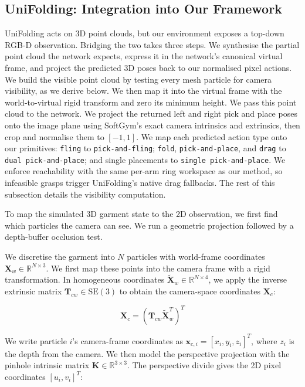 \documentclass[journal]{IEEEtran}
\begin{document}
\subsection{UniFolding: Integration into Our Framework}
UniFolding acts on 3D point clouds, but our environment exposes a top-down RGB-D observation. Bridging the two takes three steps. We synthesise the partial point cloud the network expects, express it in the network's canonical virtual frame, and project the predicted 3D poses back to our normalised pixel actions. We build the visible point cloud by testing every mesh particle for camera visibility, as we derive below. We then map it into the virtual frame with the world-to-virtual rigid transform and zero its minimum height. We pass this point cloud to the network. We project the returned left and right pick and place poses onto the image plane using SoftGym's exact camera intrinsics and extrinsics, then crop and normalise them to $[-1,1]$. We map each predicted action type onto our primitives: \texttt{fling} to \texttt{pick-and-fling}; \texttt{fold}, \texttt{pick-and-place}, and \texttt{drag} to \texttt{dual pick-and-place}; and single placements to \texttt{single pick-and-place}. We enforce reachability with the same per-arm ring workspace as our method, so infeasible grasps trigger UniFolding's native drag fallbacks. The rest of this subsection details the visibility computation.

To map the simulated 3D garment state to the 2D observation, we first find which particles the camera can see. We run a geometric projection followed by a depth-buffer occlusion test.

We discretise the garment into $N$ particles with world-frame coordinates $\mathbf{X}_w \in \mathbb{R}^{N \times 3}$. We first map these points into the camera frame with a rigid transformation. In homogeneous coordinates $\tilde{\mathbf{X}}_w \in \mathbb{R}^{N \times 4}$, we apply the inverse extrinsic matrix $\mathbf{T}_{cw} \in \text{SE}(3)$ to obtain the camera-space coordinates $\mathbf{X}_c$:

\begin{equation}
    \mathbf{X}_c = (\mathbf{T}_{cw} \tilde{\mathbf{X}}_w^T)^T
\end{equation}

We write particle $i$'s camera-frame coordinates as $\mathbf{x}_{c,i} = [x_i, y_i, z_i]^T$, where $z_i$ is the depth from the camera. We then model the perspective projection with the pinhole intrinsic matrix $\mathbf{K} \in \mathbb{R}^{3 \times 3}$. The perspective divide gives the 2D pixel coordinates $[u_i, v_i]^T$:
\end{document}
